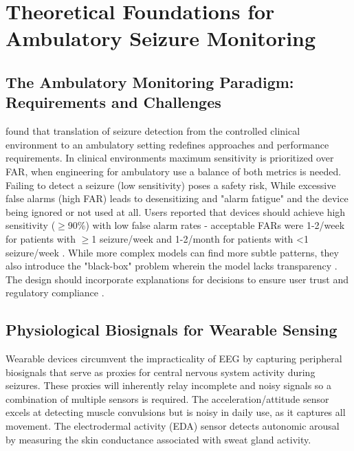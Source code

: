 \section{Theoretical Foundations for Ambulatory Seizure Monitoring}

\subsection{The Ambulatory Monitoring Paradigm: Requirements and Challenges}

\parencite{beniczkyAutomatedSeizureDetection2021, chenSeizuresDetectionUsing2022}
found that translation of seizure detection from the controlled clinical environment to
an ambulatory setting redefines approaches and performance requirements.
In clinical environments maximum sensitivity is prioritized over FAR,
when engineering for ambulatory use a balance of both metrics is needed.
Failing to detect a seizure (low sensitivity) poses a safety risk, While
excessive false alarms (high FAR) leads to desensitizing and "alarm fatigue"
and the device being ignored or not used at all.
Users reported that devices should achieve high sensitivity ($\geq$90\%)
with low false alarm rates - acceptable FARs were 1-2/week for patients with $\geq$1
seizure/week and 1-2/month for patients with <1 seizure/week
\parencite{sivathambooPreferencesUserExperiences2022}.
While more complex models can find more subtle patterns, 
they also introduce the "black-box" problem wherein the model lacks transparency 
\parencite{abualrobUnlockingNewFrontiers2025, ghaderiAdvancesMachineLearning2025}. 
The design should incorporate explanations for decisions to ensure
user trust and regulatory compliance 
\parencite{abualrobUnlockingNewFrontiers2025, mironAutonomicBiosignalsSeizure2025}.

\subsection{Physiological Biosignals for Wearable Sensing}

Wearable devices circumvent the impracticality of EEG 
by capturing peripheral biosignals that serve as proxies 
for central nervous system activity during seizures.
These proxies will inherently relay incomplete and 
noisy signals so a combination of multiple sensors
is required. The acceleration/attitude sensor excels at detecting 
muscle convulsions but is noisy in daily use, as it captures all movement. 
The electrodermal activity (EDA) sensor detects autonomic arousal by 
measuring the skin conductance associated with sweat gland activity.

